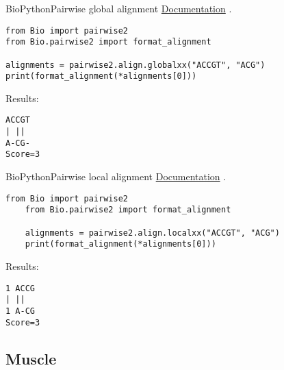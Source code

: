 \documentclass[10pt]{beamer}
\newcommand{\chref}[2]{	\href{#1}{{\usebeamercolor[bg]{Feather}#2}} }
\newcommand{\chref}[2]{	\href{#1}{{\color{blue}#2}}}
\newcommand{\1}{
	\setbeamertemplate{background}{
		\texttt{[image: img/1]}
		\tikz[overlay] \fill[fill opacity=0.75,fill=white] (0,0) rectangle (-\paperwidth,\paperheight);
	}
}
\begin{document}
\begin{frame}[fragile]{BioPython}{Pairwise global alignment}
\chref{https://biopython.org/docs/1.75/api/Bio.pairwise2.html}{Documentation}.
\begin{lstlisting}[style=python]
from Bio import pairwise2
from Bio.pairwise2 import format_alignment

alignments = pairwise2.align.globalxx("ACCGT", "ACG")
print(format_alignment(*alignments[0]))
\end{lstlisting}

Results:
\begin{lstlisting}[style=python]
ACCGT
| || 
A-CG-
Score=3
\end{lstlisting}
\end{frame}

\begin{frame}[fragile]{BioPython}{Pairwise local alignment}
	\chref{https://biopython.org/docs/1.75/api/Bio.pairwise2.html}{Documentation}.
	\begin{lstlisting}[style=python]
	from Bio import pairwise2
	from Bio.pairwise2 import format_alignment

	alignments = pairwise2.align.localxx("ACCGT", "ACG")
	print(format_alignment(*alignments[0]))
	\end{lstlisting}
	
	Results:
	\begin{lstlisting}[style=python]
1 ACCG
| ||
1 A-CG
Score=3	
	\end{lstlisting}
\end{frame}



\subsection{Muscle}
\end{document}
